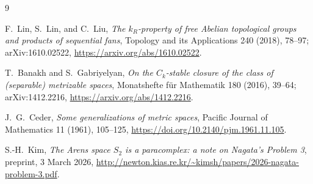 \documentclass[11pt]{article}
\begin{document}
\begin{thebibliography}{9}

F.~Lin, S.~Lin, and C.~Liu,
\emph{The $k_R$-property of free Abelian topological groups and products
of sequential fans},
Topology and its Applications 240 (2018), 78--97;
arXiv:1610.02522,
\url{https://arxiv.org/abs/1610.02522}.

T.~Banakh and S.~Gabriyelyan,
\emph{On the $C_k$-stable closure of the class of (separable) metrizable
spaces},
Monatshefte f\"ur Mathematik 180 (2016), 39--64;
arXiv:1412.2216,
\url{https://arxiv.org/abs/1412.2216}.

J.~G.~Ceder,
\emph{Some generalizations of metric spaces},
Pacific Journal of Mathematics 11 (1961), 105--125,
\url{https://doi.org/10.2140/pjm.1961.11.105}.

S.-H.~Kim,
\emph{The Arens space $S_2$ is a paracomplex: a note on Nagata's Problem 3},
preprint, 3 March 2026,
\url{http://newton.kias.re.kr/~kimsh/papers/2026-nagata-problem-3.pdf}.

\end{thebibliography}
\end{document}
